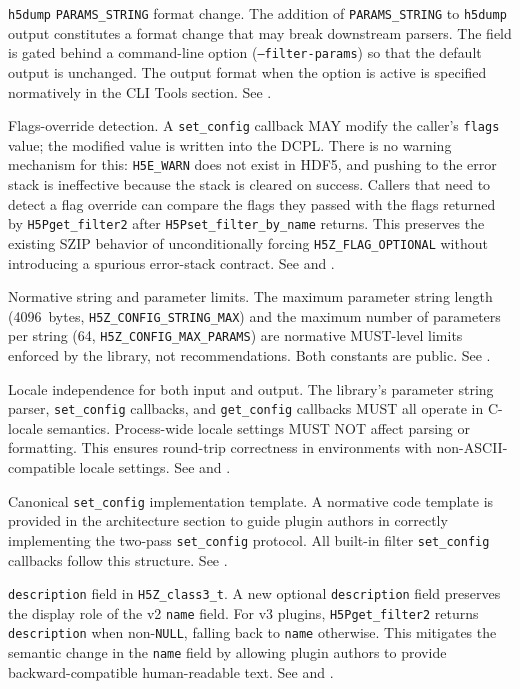 \documentclass[../HDF5_RFC.tex]{subfiles}
\begin{document}
\texttt{h5dump} \texttt{PARAMS\_STRING} format change. The addition of
\texttt{PARAMS\_STRING} to \texttt{h5dump} output constitutes a format change that may
break downstream parsers. The field is gated behind a command-line option
(\texttt{--filter-params}) so that the default output is unchanged. The output
format when the option is active is specified normatively in the CLI Tools
section. See .

Flags-override detection. A \texttt{set\_config} callback MAY modify the caller's
\texttt{flags} value; the modified value is written into the DCPL. There is no
warning mechanism for this: \texttt{H5E\_WARN} does not exist in HDF5, and pushing
to the error stack is ineffective because the stack is cleared on success.
Callers that need to detect a flag override can compare the flags they passed
with the flags returned by \texttt{H5Pget\_filter2} after
\texttt{H5Pset\_filter\_by\_name} returns. This preserves the existing SZIP behavior
of unconditionally forcing \texttt{H5Z\_FLAG\_OPTIONAL} without introducing a
spurious error-stack contract. See  and
.

Normative string and parameter limits. The maximum parameter string length
(4096~bytes, \texttt{H5Z\_CONFIG\_STRING\_MAX}) and the maximum number of
parameters per string (64, \texttt{H5Z\_CONFIG\_MAX\_PARAMS}) are normative
MUST-level limits enforced by the library, not recommendations. Both
constants are public. See .

Locale independence for both input and output. The library's parameter
string parser, \texttt{set\_config} callbacks, and \texttt{get\_config} callbacks
MUST all operate in C-locale semantics. Process-wide locale settings MUST NOT
affect parsing or formatting. This ensures round-trip correctness in
environments with non-ASCII-compatible locale settings. See
 and .

Canonical \texttt{set\_config} implementation template. A normative code
template is provided in the architecture section to guide plugin authors in
correctly implementing the two-pass \texttt{set\_config} protocol. All built-in
filter \texttt{set\_config} callbacks follow this structure. See
.

\texttt{description} field in \texttt{H5Z\_class3\_t}. A new optional
\texttt{description} field preserves the display role of the v2 \texttt{name}
field. For v3 plugins, \texttt{H5Pget\_filter2} returns \texttt{description}
when non-\texttt{NULL}, falling back to \texttt{name} otherwise. This mitigates
the semantic change in the \texttt{name} field by allowing plugin authors to
provide backward-compatible human-readable text. See
 and .
\end{document}
